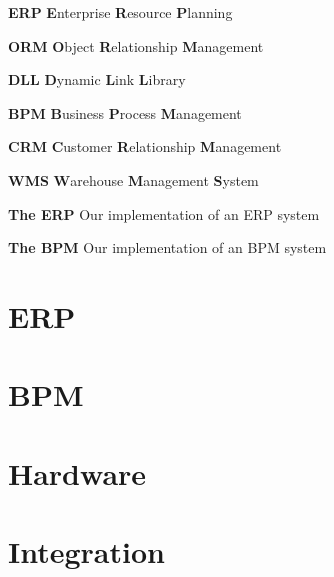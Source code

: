 \documentclass[11pt,a4paper,oneside]{bth}
\begin{document}
\begin{abbrv}
 
\item[\textbf{ERP}]           \textbf Enterprise \textbf Resource \textbf Planning
\item[\textbf{ORM}]           \textbf Object \textbf Relationship \textbf Management
\item[\textbf{DLL}]           \textbf Dynamic \textbf Link \textbf Library
\item[\textbf{BPM}]           \textbf Business \textbf Process \textbf Management
\item[\textbf{CRM}]           \textbf Customer \textbf Relationship \textbf Management
\item[\textbf{WMS}]           \textbf Warehouse \textbf Management \textbf System
\item[\textbf{The ERP}]       Our implementation of an ERP system
\item[\textbf{The BPM}]       Our implementation of an BPM system
 
\end{abbrv}

\newpage

\cleardoublepage
\pagestyle{headings}

\nocite{*}

\hypersetup{linkcolor=blue}

    \part{ERP}
    

    \part{BPM}
    

    \part{Hardware}
    

    \part{Integration}
    
    

    \printbibliography[
      heading=bibintoc,
      title={References}
      ]
\end{document}
